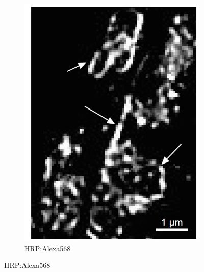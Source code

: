 \begin{figure}
\begin{subfigure}[t]{0.242\textwidth}
		\includegraphics[width=\linewidth]{images/DeepSIM_NMJ_AO_ROI1_Alexa568.jpg}
		\caption{HRP:Alexa568}
		\label{fig:DeepSIM_NMJ_AO_ROI1_Alexa568}
	\end{subfigure}
	

\end{figure}
